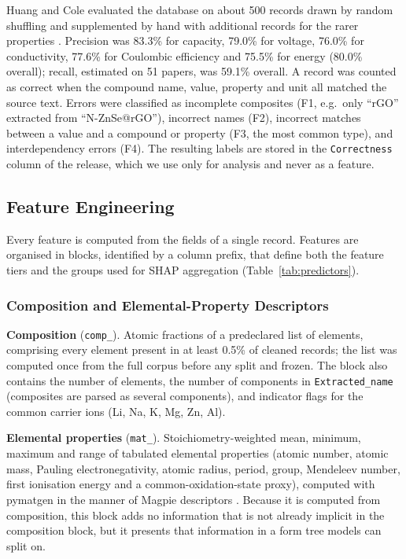\documentclass[journal=jcisd8,manuscript=article,layout=traditional]{achemso}
\begin{document}
Huang and Cole evaluated the database on about 500 records drawn by random shuffling and supplemented by hand with additional records for the rarer properties \cite{huang2020database}. Precision was 83.3\% for capacity, 79.0\% for voltage, 76.0\% for conductivity, 77.6\% for Coulombic efficiency and 75.5\% for energy (80.0\% overall); recall, estimated on 51 papers, was 59.1\% overall. A record was counted as correct when the compound name, value, property and unit all matched the source text. Errors were classified as incomplete composites (F1, e.g.\ only ``rGO'' extracted from ``N-ZnSe@rGO''), incorrect names (F2), incorrect matches between a value and a compound or property (F3, the most common type), and interdependency errors (F4). The resulting labels are stored in the \texttt{Correctness} column of the release, which we use only for analysis and never as a feature.

\subsection{Feature Engineering}
\label{sec:features}

Every feature is computed from the fields of a single record. Features are organised in blocks, identified by a column prefix, that define both the feature tiers and the groups used for SHAP aggregation (Table~\ref{tab:predictors}).

\subsubsection{Composition and Elemental-Property Descriptors}

\textbf{Composition} (\texttt{comp\_}). Atomic fractions of a predeclared list of elements, comprising every element present in at least 0.5\% of cleaned records; the list was computed once from the full corpus before any split and frozen. The block also contains the number of elements, the number of components in \texttt{Extracted\_name} (composites are parsed as several components), and indicator flags for the common carrier ions (Li, Na, K, Mg, Zn, Al).

\textbf{Elemental properties} (\texttt{mat\_}). Stoichiometry-weighted mean, minimum, maximum and range of tabulated elemental properties (atomic number, atomic mass, Pauling electronegativity, atomic radius, period, group, Mendeleev number, first ionisation energy and a common-oxidation-state proxy), computed with pymatgen \cite{ong2013pymatgen} in the manner of Magpie descriptors \cite{ward2016magpie}. Because it is computed from composition, this block adds no information that is not already implicit in the composition block, but it presents that information in a form tree models can split on.
\end{document}
